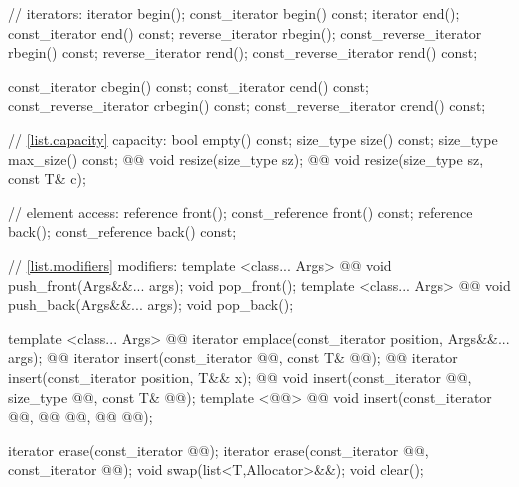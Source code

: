 \documentclass[american,twoside]{book}
\begin{document}
\begin{codeblock}
{{    // iterators:
    iterator               begin();
    const_iterator         begin() const;
    iterator               end();
    const_iterator         end() const;
    reverse_iterator       rbegin();
    const_reverse_iterator rbegin() const;
    reverse_iterator       rend();
    const_reverse_iterator rend() const;

    const_iterator         cbegin() const;
    const_iterator         cend() const;
    const_reverse_iterator crbegin() const;
    const_reverse_iterator crend() const;

    // \ref{list.capacity} capacity:
    bool      empty() const;
    size_type size() const;
    size_type max_size() const;
    @@ void resize(size_type sz);
    @@ void resize(size_type sz, const T& c);

    // element access:
    reference       front();
    const_reference front() const;
    reference       back();
    const_reference back() const;

    // \ref{list.modifiers} modifiers:
    template <class... Args> 
      @@
      void push_front(Args&&... args);
    void pop_front();
    template <class... Args> 
      @@
      void push_back(Args&&... args);
    void pop_back();

    template <class... Args> 
      @@
      iterator emplace(const_iterator position, Args&&... args);
    @@ iterator insert(const_iterator @@, const T& @@);
    @@ iterator insert(const_iterator position, T&& x);
    @@ 
      void insert(const_iterator @@, size_type @@, const T& @@);
    template <@@>
      @@
      void insert(const_iterator @@, @@ @@,
                  @@ @@);

    iterator erase(const_iterator @@);
    iterator erase(const_iterator @@, const_iterator @@);
    void     swap(list<T,Allocator>&&);
    void     clear();

}}
\end{codeblock}
\end{document}
